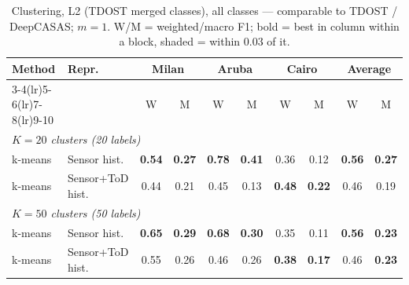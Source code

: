 \begin{table}[H]
\centering\small
\caption{Clustering, L2 (TDOST merged classes), all classes --- comparable to TDOST / DeepCASAS; $m=1$. W/M = weighted/macro F1; bold = best in column within a block, shaded = within 0.03 of it.}
\label{tab:clu_l2_all_m1}
\setlength{\tabcolsep}{3.5pt}
\begin{tabular}{llcc|cc|cc|cc}
\toprule
Method & Repr. & \multicolumn{2}{c}{Milan} & \multicolumn{2}{c}{Aruba} & \multicolumn{2}{c}{Cairo} & \multicolumn{2}{c}{Average} \\
\cmidrule(lr){3-4}\cmidrule(lr){5-6}\cmidrule(lr){7-8}\cmidrule(lr){9-10}
 & & W & M & W & M & W & M & W & M \\
\midrule
\multicolumn{10}{l}{\textit{$K = 20$ clusters (20 labels)}} \\
\midrule
k-means & Sensor hist. & \cellcolor{blue!12}\textbf{0.54} & \cellcolor{blue!12}\textbf{0.27} & \cellcolor{blue!12}\textbf{0.78} & \cellcolor{blue!12}\textbf{0.41} & 0.36 & 0.12 & \cellcolor{blue!12}\textbf{0.56} & \cellcolor{blue!12}\textbf{0.27} \\
k-means & Sensor+ToD hist. & 0.44 & 0.21 & 0.45 & 0.13 & \cellcolor{blue!12}\textbf{0.48} & \cellcolor{blue!12}\textbf{0.22} & 0.46 & 0.19 \\
\midrule
\multicolumn{10}{l}{\textit{$K = 50$ clusters (50 labels)}} \\
\midrule
k-means & Sensor hist. & \cellcolor{blue!12}\textbf{0.65} & \cellcolor{blue!12}\textbf{0.29} & \cellcolor{blue!12}\textbf{0.68} & \cellcolor{blue!12}\textbf{0.30} & 0.35 & 0.11 & \cellcolor{blue!12}\textbf{0.56} & \cellcolor{blue!12}\textbf{0.23} \\
k-means & Sensor+ToD hist. & 0.55 & 0.26 & 0.46 & 0.26 & \cellcolor{blue!12}\textbf{0.38} & \cellcolor{blue!12}\textbf{0.17} & 0.46 & \cellcolor{blue!12}\textbf{0.23} \\
\bottomrule
\end{tabular}
\end{table}
